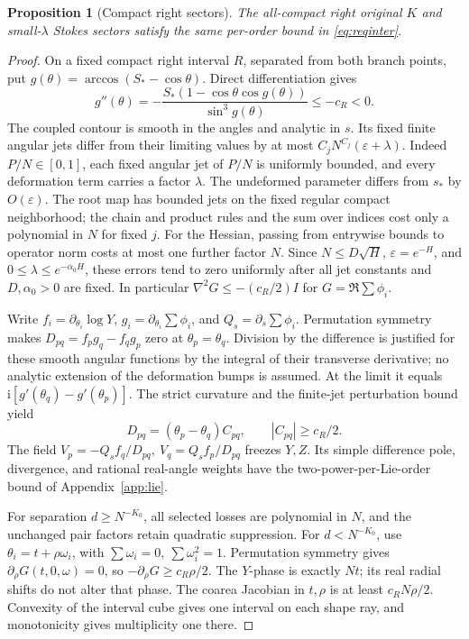 \documentclass[11pt]{article}
\numberwithin{equation}{section}
\newtheorem{proposition}[theorem]{Proposition}
\theoremstyle{definition}
\newcommand{\ii}{\mathrm i}
\newcommand{\eps}{\varepsilon}
\begin{document}
\begin{proposition}[Compact right sectors]\label{prop:compactR}
The all-compact right original \(K\) and small-\(\lambda\) Stokes
sectors satisfy the same per-order bound in \eqref{eq:reqinter}.
\end{proposition}
\begin{proof}
On a fixed compact right interval \(R\), separated from both branch
points, put \(g(\theta)=\arccos(S_*-\cos\theta)\). Direct differentiation
gives
\[
 g''(\theta)=-\frac{S_*(1-\cos\theta\cos g(\theta))}{\sin^3g(\theta)}
            \le-c_R<0 .
\]
The coupled contour is smooth in the angles and analytic in \(s\).
Its fixed finite angular jets differ from their limiting values by at most
\(C_jN^{C_j}(\eps+\lambda)\). Indeed \(P/N\in[0,1]\), each
fixed angular jet of \(P/N\) is uniformly bounded, and every
deformation term carries a factor \(\lambda\). The undeformed
parameter differs from \(s_*\) by \(O(\eps)\). The root map has
bounded jets on the fixed regular compact neighborhood; the chain
and product rules and the sum over indices cost only a polynomial
in \(N\) for fixed \(j\). For the Hessian, passing from entrywise
bounds to operator norm costs at most one further factor \(N\).
Since \(N\le D\sqrt H\), \(\eps=e^{-H}\), and
\(0\le\lambda\le e^{-\alpha_0H}\), these errors tend to zero
uniformly after all jet constants and \(D,\alpha_0>0\) are fixed.
In particular
\(\nabla^2 G\le-(c_R/2)I\) for \(G=\Re\sum\phi_i\).

Write \(f_i=\partial_{\theta_i}\log Y\), \(g_i=\partial_{\theta_i}\sum\phi_i\),
and \(Q_s=\partial_s\sum\phi_i\). Permutation symmetry makes
\(D_{pq}=f_pg_q-f_qg_p\) zero at \(\theta_p=\theta_q\).
Division by the difference is justified for these smooth angular
functions by the integral of their transverse derivative; no analytic
extension of the deformation bumps is assumed.
At the limit it equals \(\ii[g'(\theta_q)-g'(\theta_p)]\).
The strict curvature and the finite-jet perturbation bound yield
\[
 D_{pq}=(\theta_p-\theta_q)C_{pq},\qquad |C_{pq}|\ge c_R/2 .
\]
The field
\(V_p=-Q_sf_q/D_{pq},\ V_q=Q_sf_p/D_{pq}\)
freezes \(Y,Z\). Its simple difference pole, divergence, and
rational real-angle weights have the two-power-per-Lie-order
bound of Appendix~\ref{app:lie}.

For separation \(d\ge N^{-K_0}\), all selected losses are polynomial
in \(N\), and the unchanged pair factors retain quadratic suppression.
For \(d<N^{-K_0}\), use \(\theta_i=t+\rho\omega_i\), with
\(\sum\omega_i=0,\ \sum\omega_i^2=1\).
Permutation symmetry gives \(\partial_\rho G(t,0,\omega)=0\),
so \(-\partial_\rho G\ge c_R\rho/2\).
The \(Y\)-phase is exactly \(Nt\); its real radial shifts do not
alter that phase. The coarea Jacobian in \(t,\rho\) is at least
\(c_RN\rho/2\). Convexity of the interval cube gives one interval
on each shape ray, and monotonicity gives multiplicity one there.


\end{proof}
\end{document}
